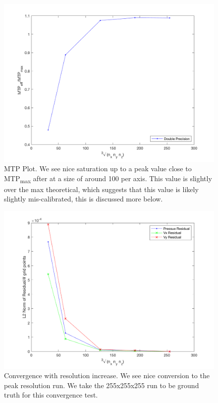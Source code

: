 \begin{figure}[h!]
\begin{center}
	\includegraphics[width = .6\textwidth]{../3dvis/runTimes.png}
	\caption{\myfont MTP Plot. We see nice saturation up to a peak value close to MTP\textsubscript{max} after at a size of around 100 per axis. This value is slightly over the max theoretical, which suggests that this value is likely slightly mis-calibrated, this is discussed more below.}
	\label{fig:mtp}
\end{center}
\end{figure}

\begin{figure}[h!]
\begin{center}
	\includegraphics[width = .6\textwidth]{../3dvis/resids.png}
	\caption{\myfont Convergence with resolution increase. We see nice conversion to the peak resolution run. We take the 255x255x255 run to be ground truth for this convergence test.}
	\label{fig:conv}
\end{center}
\end{figure}

